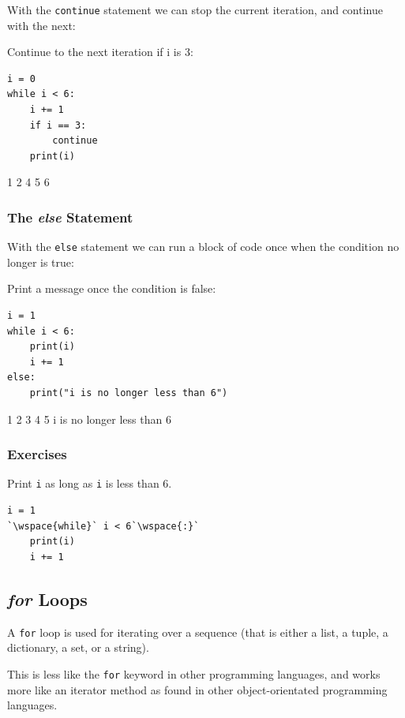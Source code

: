 \documentclass[12pt,a4paper]{article}
\newcommand{\wspace}[1]{%
	\color{white}\colorbox{white}{\texttt{#1}}%
}
\newcommand{\code}[1]{%
	\colorbox{backcolour}{\lstinline{#1}}%
}
\newcommand{\lcode}[1]{%
	\lstinline{#1}%
}
\begin{document}
With the \code{continue} statement we can stop the current iteration, and
continue with the next:

\begin{ebox}
Continue to the next iteration if i is 3:
	\begin{lstlisting}
i = 0
while i < 6:
    i += 1
    if i == 3:
        continue
    print(i)
	\end{lstlisting}
\tcblower
	\begin{vercode}
1
2
4
5
6
	\end{vercode}
\end{ebox}
\subsubsection{The \textit{else} Statement}

With the \code{else} statement we can run a block of code once when the
condition no longer is true:

\begin{ebox}
Print a message once the condition is false:
	\begin{lstlisting}
i = 1
while i < 6:
    print(i)
    i += 1
else:
    print("i is no longer less than 6")
	\end{lstlisting}
\tcblower
	\begin{vercode}
1
2
3
4
5
i is no longer less than 6
	\end{vercode}
\end{ebox}
\subsubsection{Exercises}

\begin{tbox}
Print \lcode{i} as long as \lcode{i} is less than 6.
	\begin{lstlisting}
i = 1
`\wspace{while}` i < 6`\wspace{:}`
    print(i)
    i += 1
	\end{lstlisting}
\end{tbox}
\vfill\newpage
\subsection{\textit{for} Loops}\label{pyForLoop}

A \code{for} loop is used for iterating over a sequence (that is either a list,
a tuple, a dictionary, a set, or a string).

This is less like the \code{for} keyword in other programming languages, and
works more like an iterator method as found in other object-orientated
programming languages.
\end{document}
